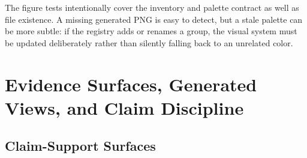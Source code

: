 \documentclass[
]{article}
\begin{document}
The figure tests intentionally cover the inventory and palette contract
as well as file existence. A missing generated PNG is easy to detect,
but a stale palette can be more subtle: if the registry adds or renames
a group, the visual system must be updated deliberately rather than
silently falling back to an unrelated color.

\newpage

\section{Evidence Surfaces, Generated Views, and Claim
Discipline}\label{sec:artifacts_evidence}

\subsection{Claim-Support Surfaces}\label{claim-support-surfaces}
\end{document}
